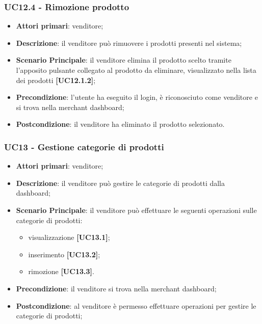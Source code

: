 \subsubsection{UC12.4 - Rimozione prodotto}
\begin{itemize}
\item \textbf{Attori primari}: venditore;
\item \textbf{Descrizione}: il venditore può rimuovere i prodotti presenti nel sistema;
\item \textbf{Scenario Principale}: il venditore elimina il prodotto scelto tramite l'apposito pulsante collegato al prodotto da eliminare, visualizzato nella lista dei prodotti \textbf{[UC12.1.2]};
\item \textbf{Precondizione}: l'utente ha eseguito il login, è riconosciuto come venditore e si trova nella merchant dashboard;
\item \textbf{Postcondizione}: il venditore ha eliminato il prodotto selezionato.
\end{itemize}

\subsubsection{UC13 - Gestione categorie di prodotti}
\begin{itemize}
\item \textbf{Attori primari}: venditore;
\item \textbf{Descrizione}: il venditore può gestire le categorie di prodotti dalla dashboard;
\item \textbf{Scenario Principale}: il venditore può effettuare le seguenti operazioni sulle categorie di prodotti:
\begin{itemize}
	\item visualizzazione \textbf{[UC13.1]};
	\item inserimento \textbf{[UC13.2]};
	\item rimozione \textbf{[UC13.3]}.
\end{itemize}
\item \textbf{Precondizione}: il venditore si trova nella merchant dashboard;
\item \textbf{Postcondizione}: al venditore è permesso effettuare operazioni per gestire le categorie di prodotti;
\end{itemize}

